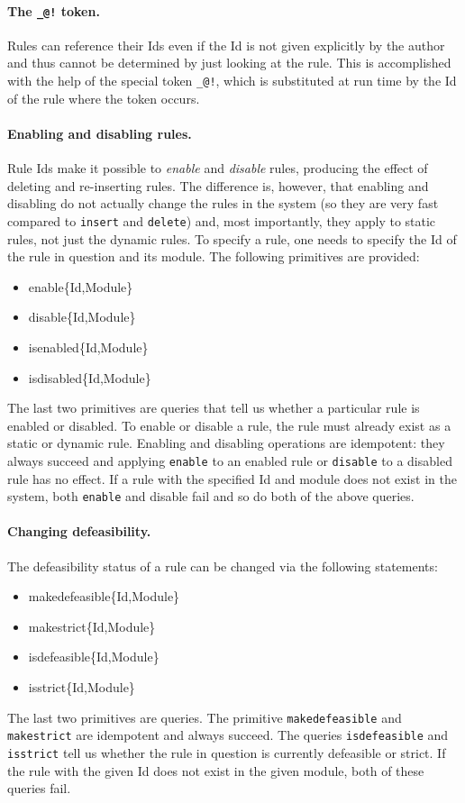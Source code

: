 \documentclass[11pt]{article}
\begin{document}
\paragraph{The \texttt{\_@!} token.} 
Rules can reference their Ids even if the Id is not given explicitly by the
author and thus cannot be determined by just looking at the rule. This is
accomplished with the help of the special token \texttt{\_@!}, which is
substituted at run time by the Id of the rule where the token occurs.

\paragraph{Enabling and disabling rules.}
Rule Ids make it possible to \emph{enable} and \emph{disable} rules,
producing the effect of deleting and re-inserting rules.
The difference is, however, that enabling and disabling do not actually
change the rules in the system (so they are very fast compared to
\texttt{insert} and \texttt{delete}) and, most importantly, they apply to
static rules, not just the dynamic rules.  To specify a rule, one needs to
specify the Id of the rule in question and its module. The following
primitives are provided:
\begin{itemize}
\item enable\{Id,Module\}
\item disable\{Id,Module\}
\item isenabled\{Id,Module\}
\item isdisabled\{Id,Module\}
\end{itemize}
The last two primitives are queries that tell us whether a particular rule
is enabled or disabled. To enable or disable a rule, the rule must already
exist as a static or dynamic rule. Enabling  and disabling operations are
idempotent: they always succeed and applying \texttt{enable} to an enabled
rule or \texttt{disable} to a disabled rule has no effect.  
If a rule with the specified Id and module does not exist in the system,
both \texttt{enable} and disable fail and so do both of the above queries.

\paragraph{Changing defeasibility.}
The defeasibility status of a rule can be changed via the following
statements:
\begin{itemize}
\item  makedefeasible\{Id,Module\}
\item  makestrict\{Id,Module\}
\item  isdefeasible\{Id,Module\}
\item  isstrict\{Id,Module\}
\end{itemize}
The last two primitives are queries. The primitive \texttt{makedefeasible}
and \texttt{makestrict} are idempotent and always succeed. The queries
\texttt{isdefeasible} and \texttt{isstrict} tell us whether the rule in
question is currently defeasible or strict.    
If the rule with the given Id does not exist in the given module, both of
these queries fail.
\end{document}
